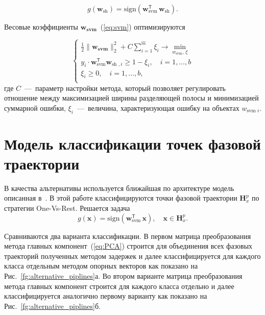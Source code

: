 \documentclass[article,14pt,subf,href,colorlinks=true
]{disser}
\begin{document}
\begin{equation}
    g(\mathbf{w}_{\text{sh}}) = \text{sign}(\mathbf{{w}}_{\text{svm}}^{\mathsf{T}}\,\mathbf{w}_{\text{sh}}).
\label{eq:svm}
\end{equation}

Весовые коэффициенты $\mathbf{{w}_{\text{svm}}}$~(\ref{eq:svm}) оптимизируются

\begin{equation}
\begin{cases}
    \frac{1}{2}\|\mathbf{{w}_{\text{svm}}}\|_2^2 + C\sum_{i=1}^{\hat{m}}\xi_i \xrightarrow{} \min_{{w}_{\text{svm}},\,\xi}\\
    y_i \cdot \mathbf{{w}}_{\text{svm}}^{\mathsf{T}}\mathbf{w}_{\text{sh },i} \geq 1 - \xi_i, \quad i = 1,\dots,b\\
    \xi_i \geq 0, \quad i = 1,\dots,b,\\
\end{cases}
\label{eq:svm_solutin}
\end{equation}
где $C$~---~параметр настройки метода, который позволяет регулировать отношение между максимизацией ширины разделяющей полосы и минимизацией суммарной ошибки, $\xi_i$~---~величина, характеризующая ошибку на объектах ${w}_{\text{svm }i}$. 
\newpage
\section{Модель классификации точек фазовой траектории}

В качества альтернативы используется ближайшая по архитектуре модель описанная в~\cite{Frank_2010}.
В этой работе классифицируются точки фазовой траектории $\mathbf{H}_{x}^{p}$ по стратегии One-Vs-Rest.
Решается задача
\begin{equation}
    g(\mathbf{x}) = \text{sign}(\mathbf{{w}}_{\text{svm}}^{\mathsf{T}}\,\mathbf{x}),
    \quad
    \mathbf{x} \in \mathbf{H}_{x}^{p}.
\label{eq:alternative_svm}
\end{equation}

Сравниваются два варианта классификации.
В первом матрица преобразования метода главных компонент~(\ref{eq:PCA}) строится для объединения всех фазовых траекторий полученных методом задержек и далее классифицируется для каждого класса отдельным методом опорных векторов как показано на Рис.~\ref{fg:alternative_piplines}а.
Во втором варианте матрица преобразования метода главных компонент строится для каждого класса отдельно и далее классифицируется аналогично первому варианту как показано на Рис.~\ref{fg:alternative_piplines}б.
\end{document}
